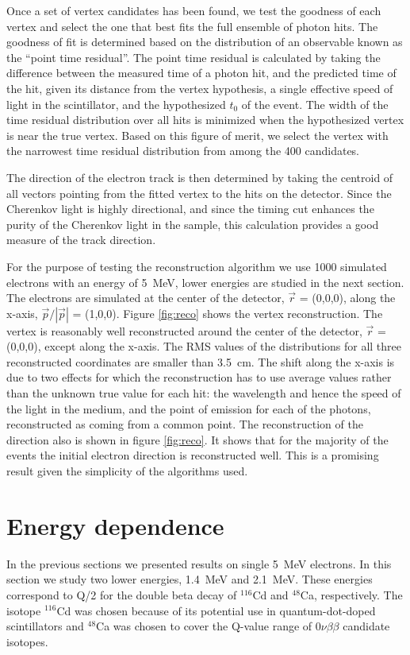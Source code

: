 \documentclass[cits]{JINST}
\begin{document}
Once a set of vertex candidates has been found, we test the goodness
of each vertex and select the one that best fits the full ensemble of
photon hits. The goodness of fit is determined based on the
distribution of an observable known as the ``point time
residual''\cite{SuperKalgo}. The point time residual is calculated by
taking the difference between the measured time of a photon hit, and
the predicted time of the hit, given its distance from the vertex
hypothesis, a single effective speed of light in the scintillator, and
the hypothesized $t_0$ of the event. The width of the time residual
distribution over all hits is minimized when the hypothesized vertex
is near the true vertex. Based on this figure of merit, we select the
vertex with the narrowest time residual distribution from among the
400 candidates.

The direction of the electron track is then determined by taking the
centroid of all vectors pointing from the fitted vertex to the hits on
the detector. Since the Cherenkov light is highly directional, and
since the timing cut enhances the purity of the Cherenkov light in the
sample, this calculation provides a good measure of the track
direction. 

For the purpose of testing the reconstruction algorithm we use 1000
simulated electrons with an energy of 5~MeV, lower energies are studied in the next section.
The electrons are simulated at the center of the detector, $\vec{r}$ = (0,0,0), along
the x-axis, $\vec{p}/|\vec{p}|$ = (1,0,0). Figure \ref{fig:reco}
shows the vertex reconstruction. The vertex is reasonably well
reconstructed around the center of the detector, $\vec{r}$ = (0,0,0),
except along the x-axis. The RMS values of the distributions for all three
reconstructed coordinates are smaller than 3.5~cm. The shift along
the x-axis is due to two effects for which the reconstruction has to
use average values rather than the unknown true value for each
hit: the wavelength and hence the speed of the light in the medium,
and the point of emission for each of the photons, reconstructed
as coming from a common point. The reconstruction of the direction
also is shown in figure \ref{fig:reco}. It shows that for the majority
of the events the initial electron direction is reconstructed well.
This is a promising result given the simplicity of the algorithms
used.

\section{Energy dependence}
\label{edep_section}
In the previous sections we presented results on single 5~MeV electrons.
In this section we study two lower energies, 1.4~MeV and 2.1~MeV. These
energies correspond to Q/2 for the double beta decay of
$^{116}$Cd and $^{48}$Ca, respectively\cite{cd1,biller}. The isotope
$^{116}$Cd was chosen because of its potential use in quantum-dot-doped
scintillators\cite{qdot,qdot2} and $^{48}$Ca was chosen
to cover the Q-value range of $0\nu\beta\beta$ candidate isotopes.
\end{document}
